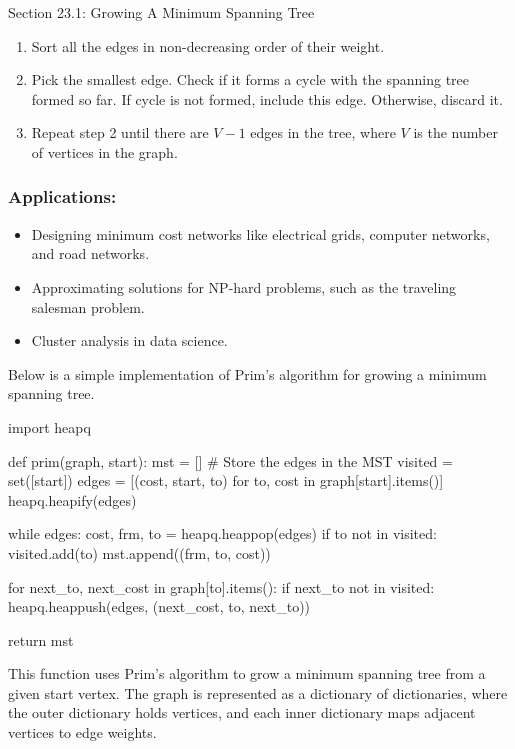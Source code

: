 \begin{notes}{Section 23.1: Growing A Minimum Spanning Tree}
    \begin{enumerate}
        \item Sort all the edges in non-decreasing order of their weight.
        \item Pick the smallest edge. Check if it forms a cycle with the spanning tree formed so far. If cycle is not formed, include this edge. Otherwise, discard it.
        \item Repeat step 2 until there are \(V-1\) edges in the tree, where \(V\) is the number of vertices in the graph.
    \end{enumerate}
    
    \subsubsection*{Applications:}

    \begin{itemize}
        \item Designing minimum cost networks like electrical grids, computer networks, and road networks.
        \item Approximating solutions for NP-hard problems, such as the traveling salesman problem.
        \item Cluster analysis in data science.
    \end{itemize}
    
    \begin{highlight}

    Below is a simple implementation of Prim's algorithm for growing a minimum spanning tree.

    \begin{code}[Python]
    import heapq
    
    def prim(graph, start):
        mst = []  # Store the edges in the MST
        visited = set([start])
        edges = [(cost, start, to) for to, cost in graph[start].items()]
        heapq.heapify(edges)
    
        while edges:
            cost, frm, to = heapq.heappop(edges)
            if to not in visited:
                visited.add(to)
                mst.append((frm, to, cost))
    
                for next_to, next_cost in graph[to].items():
                    if next_to not in visited:
                        heapq.heappush(edges, (next_cost, to, next_to))
    
        return mst
    \end{code}
    This function uses Prim's algorithm to grow a minimum spanning tree from a given start vertex. The graph is represented as a dictionary of dictionaries, where the outer dictionary holds vertices, 
    and each inner dictionary maps adjacent vertices to edge weights.
    \end{highlight}    
\end{notes}

